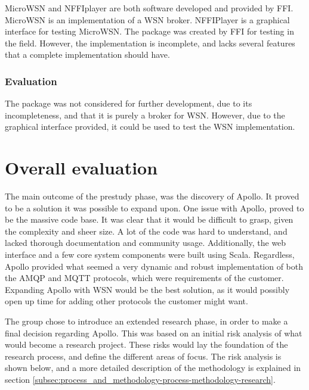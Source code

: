 MicroWSN and NFFIplayer are both software developed and provided by FFI. MicroWSN is an implementation of a WSN broker. NFFIPlayer is a graphical interface for testing MicroWSN. The package was created by FFI for testing in the field. However, the implementation is incomplete, and lacks several features that a complete implementation should have.

\subsubsection{Evaluation}
\label{subsec:prestudies-existing_solutions-micro_wsn_and_nffiplayer-evaluation}

The package was not considered for further development, due to its incompleteness, and that it is purely a broker for WSN. However, due to the graphical interface provided, it could be used to test the WSN implementation.

\section{Overall evaluation}
\label{sec:prestudies-overall_evaluation}

The main outcome of the prestudy phase, was the discovery of Apollo. It proved to be a solution it was possible to expand upon. One issue with Apollo, proved to be the massive code base. It was clear that it would be difficult to grasp, given the complexity and sheer size. A lot of the code was hard to understand, and lacked thorough documentation and community usage. Additionally, the web interface and a few core system components were built using Scala. Regardless, Apollo provided what seemed a very dynamic and robust implementation of both the AMQP and MQTT protocols, which were requirements of the customer. Expanding Apollo with WSN would be the best solution, as it would possibly open up time for adding other protocols the customer might want.

The group chose to introduce an extended research phase, in order to make a final decision regarding Apollo. This was based on an initial risk analysis of what would become a research project. These risks would lay the foundation of the research process, and define the different areas of focus. The risk analysis is shown below, and a more detailed description of the methodology is explained in section \ref{subsec:process_and_methodology-process-methodology-research}.

